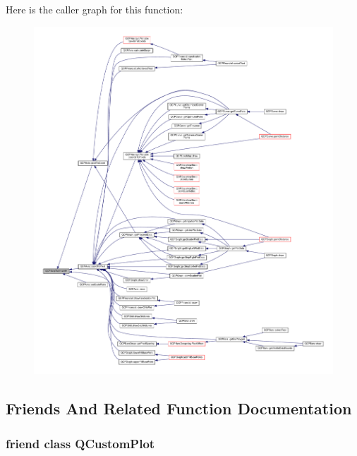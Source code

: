 Here is the caller graph for this function\+:\nopagebreak
\begin{figure}[H]
\begin{center}
\leavevmode
\includegraphics[width=350pt]{class_q_c_p_axis_rect_a45bf5c17f4ca29131b7eb0db06efc259_icgraph}
\end{center}
\end{figure}




\subsection{Friends And Related Function Documentation}
\hypertarget{class_q_c_p_axis_rect_a1cdf9df76adcfae45261690aa0ca2198}{}
\subsubsection[{Q\+Custom\+Plot}]{\setlength{\rightskip}{0pt plus 5cm}friend class {\bf Q\+Custom\+Plot}\hspace{0.3cm}{\ttfamily [friend]}}\label{class_q_c_p_axis_rect_a1cdf9df76adcfae45261690aa0ca2198}


